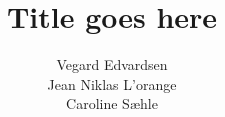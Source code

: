 \documentclass[a4paper,10pt]{article}
\title{Title goes here}
\author{Vegard Edvardsen\\Jean Niklas L'orange\\Caroline Sæhle}
\begin{document}
\maketitle

\begin{abstract}

\end{abstract}






%
\end{document}
